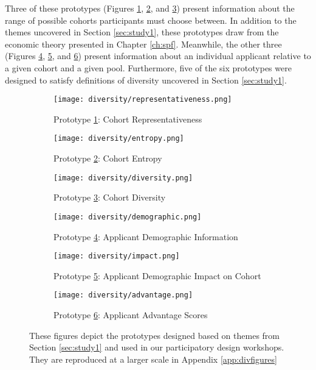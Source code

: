 Three of these prototypes (Figures \ref{fig:representativeness}, \ref{fig:entropy}, and \ref{fig:diversity}) present information about the range of possible cohorts participants must choose between. In addition to the themes uncovered in Section \ref{sec:study1}, these prototypes draw from the economic theory presented in Chapter \ref{ch:spf}. Meanwhile, the other three (Figures \ref{fig:demographic}, \ref{fig:impact}, and \ref{fig:advantage}) present information about an individual applicant relative to a given cohort and a given pool. Furthermore, five of the six prototypes were designed to satisfy definitions of diversity uncovered in Section \ref{sec:study1}.

\begin{figure}[htbp]
    \centering
    \begin{subfigure}[b]{0.3\textwidth}
        \texttt{[image: diversity/representativeness.png]}
        \caption{Prototype \ref{fig:representativeness}: Cohort Representativeness}
        \label{fig:representativeness}
    \end{subfigure}
    \hfill
    \begin{subfigure}[b]{0.3\textwidth}
        \texttt{[image: diversity/entropy.png]}
        \caption{Prototype \ref{fig:entropy}: Cohort Entropy}
        \label{fig:entropy}
    \end{subfigure}
    \hfill
    \begin{subfigure}[b]{0.3\textwidth}
        \texttt{[image: diversity/diversity.png]}
        \caption{Prototype \ref{fig:diversity}: Cohort Diversity}
        \label{fig:diversity}
    \end{subfigure}

    \medskip

    \begin{subfigure}[b]{0.3\textwidth}
        \texttt{[image: diversity/demographic.png]}
        \caption{Prototype \ref{fig:demographic}: Applicant Demographic Information}
        \label{fig:demographic}
    \end{subfigure}
    \hfill
    \begin{subfigure}[b]{0.3\textwidth}
        \texttt{[image: diversity/impact.png]}
        \caption{Prototype \ref{fig:impact}: Applicant Demographic Impact on Cohort}
        \label{fig:impact}
    \end{subfigure}
    \hfill
    \begin{subfigure}[b]{0.3\textwidth}
        \texttt{[image: diversity/advantage.png]}
        \caption{Prototype \ref{fig:advantage}: Applicant Advantage Scores}
        \label{fig:advantage}
    \end{subfigure}
    \caption{These figures depict the prototypes designed based on themes from Section \ref{sec:study1} and used in our participatory design workshops. They are reproduced at a larger scale in Appendix \ref{app:divfigures}}
    \label{fig:prototypes}
\end{figure}

